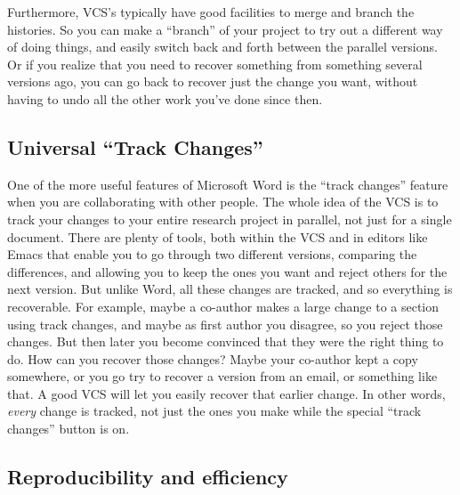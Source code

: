 \documentclass{article}
\begin{document}
Furthermore, VCS's typically have good facilities to merge and branch the histories. So you can make a ``branch'' of your project to try out a different way of doing things, and easily switch back and forth between the parallel versions.  Or if you realize that you need to recover something from something several versions ago, you can go back to recover just the change you want, without having to undo all the other work you've done since then.
\subsection{Universal ``Track Changes''}
\label{sec-2-3}

One of the more useful features of Microsoft Word is the ``track changes'' feature when you are collaborating with other people.  The whole idea of the VCS is to track your changes to your entire research project in parallel, not just for a single document. There are plenty of tools, both within the VCS and in editors like Emacs that enable you to go through two different versions, comparing the differences, and allowing you to keep the ones you want and reject others for the next version.  But unlike Word, all these changes are tracked, and so everything is recoverable. For example, maybe a co-author makes a large change to a section using track changes, and maybe as first author you disagree, so you reject those changes. But then later you become convinced that they were the right thing to do.  How can you recover those changes?  Maybe your co-author kept a copy somewhere, or you go try to recover a version from an email, or something like that. A good VCS will let you easily recover that earlier change.  In other words, \emph{every} change is tracked, not just the ones you make while the special ``track changes'' button is on.
\subsection{Reproducibility and efficiency}
\label{sec-2-4}
\end{document}
